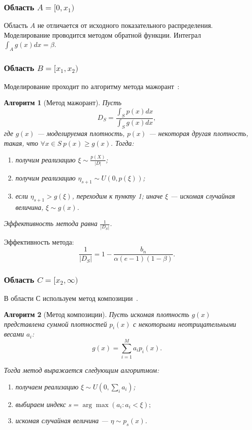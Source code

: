 \documentclass[12pt, specialist, subf, substylefile = spbu.rtx]{disser}
\newtheorem{algo}{Алгоритм}
\begin{document}

\subsubsection{Область $A=[0, x_1)$}

Область $A$ не отличается от исходного показательного распределения. Моделирование проводится методом обратной функции. Интеграл $\int_A g(x) dx = \beta$.


\subsubsection{Область $B=[x_1, x_2)$}

Моделирование проходит по алгоритму метода мажорант~\cite{MonErm}:

\begin{algo}[Метод мажорант]\label{algo:mag}
Пусть 
$$
D_S=\frac{\int_S p(x) dx}{\int_S g(x) dx},
$$
где $g(x)$ --- моделируемая плотность, $p(x)$ --- некоторая другая плотность, такая, что $\forall x \in S \ p(x) \ge g(x)$. Тогда:
\begin{enumerate}
\item получим реализацию $\xi \sim \frac{p(X)}{|D|}$;
\item получим реализацию $\eta_{s+1} \sim U(0, p(\xi))$;
\item если $\eta_{s+1} > g(\xi)$, переходим к пункту 1; иначе $\xi$ --- искомая случайная величина, $\xi \sim g(x)$.
\end{enumerate}
Эффективность метода равна $\frac{1}{|D_S|}$.
\end{algo}

Эффективность метода:
$$
\frac{1}{|D_S|}=1-\frac{b_n}{\alpha(e-1)(1-\beta)}.
$$


\subsubsection{Область $C=[x_2, \infty)$}

В области $С$ используем метод композиции~\cite{MonErm}. 

\begin{algo}[Метод композиции]\label{alg:comp}
Пусть искомая плотность $g(x)$ представлена суммой плотностей $p_i(x)$ с некоторыми неотрицательными весами $a_i$:
\begin{equation}\label{eq:comp_common}
g(x)=\sum\limits_{i=1}^M a_ip_i(x).
\end{equation}

Тогда метод выражается следующим алгоритмом:
\begin{enumerate}
\item получаем реализацию $\xi \sim U(0, \sum_i a_i)$;
\item выбираем индекс $s=\arg\max(a_i:a_i<\xi);$
\item искомая случайная величина --- $\eta \sim p_s(x)$.
\end{enumerate}
\end{algo}
\end{document}
